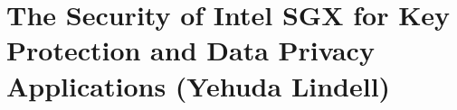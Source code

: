 \section{The Security of Intel SGX for Key Protection and Data Privacy Applications (Yehuda Lindell)}

